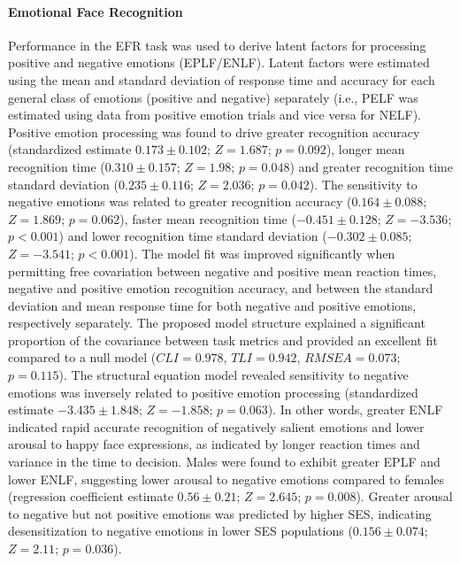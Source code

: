 \documentclass[utf8]{frontiersSCNS} %
\begin{document}
\paragraph{Emotional Face Recognition} Performance in the EFR task was used to derive latent factors for processing positive and negative emotions (EPLF/ENLF). Latent factors were estimated using the mean and standard deviation of response time and accuracy for each general class of emotions (positive and negative) separately (i.e., PELF was estimated using data from positive emotion trials and vice versa for NELF). Positive emotion processing was found to drive greater recognition accuracy (standardized estimate $0.173\pm0.102$; $Z=1.687$; $p=0.092$), longer mean recognition time ($0.310\pm0.157$; $Z=1.98$; $p=0.048$) and greater recognition time standard deviation ($0.235\pm0.116$; $Z=2.036$; $p=0.042$). The sensitivity to negative emotions was related to greater recognition accuracy ($0.164\pm0.088$; $Z=1.869$; $p=0.062$), faster mean recognition time ($-0.451\pm0.128$; $Z=-3.536$; $p<0.001$) and lower recognition time standard deviation ($-0.302\pm0.085$; $Z=-3.541$; $p<0.001$). The model fit was improved significantly when permitting free covariation between negative and positive mean reaction times, negative and positive emotion recognition accuracy, and between the standard deviation and mean response time for both negative and positive emotions, respectively separately. The proposed model structure explained a significant proportion of the covariance between task metrics and provided an excellent fit compared to a null model ($CLI = 0.978$, $TLI = 0.942$, $RMSEA = 0.073$; $p = 0.115$). The structural equation model revealed sensitivity to negative emotions was inversely related to positive emotion processing (standardized estimate $-3.435\pm1.848$; $Z=-1.858$; $p = 0.063$). In other words, greater ENLF indicated rapid accurate recognition of negatively salient emotions and lower arousal to happy face expressions, as indicated by longer reaction times and variance in the time to decision. Males were found to exhibit greater EPLF and lower ENLF, suggesting lower arousal to negative emotions compared to females (regression coefficient estimate $0.56\pm0.21$; $Z=2.645$; $p = 0.008$). Greater arousal to negative but not positive emotions was predicted by higher SES, indicating desensitization to negative emotions in lower SES populations ($0.156\pm0.074$; $Z=2.11$; $p = 0.036$). 
\end{document}
